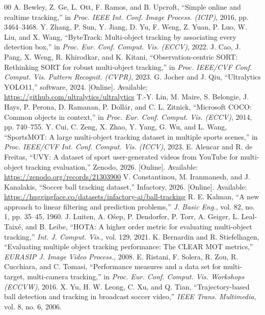 \documentclass[conference]{IEEEtran}
\begin{document}
\begin{thebibliography}{00}
 A. Bewley, Z. Ge, L. Ott, F. Ramos, and B. Upcroft, ``Simple online and realtime tracking,'' in \emph{Proc. IEEE Int. Conf. Image Process. (ICIP)}, 2016, pp. 3464--3468.
 Y. Zhang, P. Sun, Y. Jiang, D. Yu, F. Weng, Z. Yuan, P. Luo, W. Liu, and X. Wang, ``ByteTrack: Multi-object tracking by associating every detection box,'' in \emph{Proc. Eur. Conf. Comput. Vis. (ECCV)}, 2022.
 J. Cao, J. Pang, X. Weng, R. Khirodkar, and K. Kitani, ``Observation-centric SORT: Rethinking SORT for robust multi-object tracking,'' in \emph{Proc. IEEE/CVF Conf. Comput. Vis. Pattern Recognit. (CVPR)}, 2023.
 G. Jocher and J. Qiu, ``Ultralytics YOLO11,'' software, 2024. [Online]. Available: \url{https://github.com/ultralytics/ultralytics}
 T.-Y. Lin, M. Maire, S. Belongie, J. Hays, P. Perona, D. Ramanan, P. Doll\'ar, and C. L. Zitnick, ``Microsoft COCO: Common objects in context,'' in \emph{Proc. Eur. Conf. Comput. Vis. (ECCV)}, 2014, pp. 740--755.
 Y. Cui, C. Zeng, X. Zhao, Y. Yang, G. Wu, and L. Wang, ``SportsMOT: A large multi-object tracking dataset in multiple sports scenes,'' in \emph{Proc. IEEE/CVF Int. Conf. Comput. Vis. (ICCV)}, 2023.
 E. Alencar and R. de Freitas, ``UVY: A dataset of sport user-generated videos from YouTube for multi-object tracking evaluation,'' Zenodo, 2026. [Online]. Available: \url{https://zenodo.org/records/21303900}
 V. Constantinou, M. Iranmanesh, and J. Kanalakis, ``Soccer ball tracking dataset,'' Infactory, 2026. [Online]. Available: \url{https://huggingface.co/datasets/infactory-ai/ball-tracking}
 R. E. Kalman, ``A new approach to linear filtering and prediction problems,'' \emph{J. Basic Eng.}, vol. 82, no. 1, pp. 35--45, 1960.
 J. Luiten, A. O\v{s}ep, P. Dendorfer, P. Torr, A. Geiger, L. Leal-Taix\'e, and B. Leibe, ``HOTA: A higher order metric for evaluating multi-object tracking,'' \emph{Int. J. Comput. Vis.}, vol. 129, 2021.
 K. Bernardin and R. Stiefelhagen, ``Evaluating multiple object tracking performance: The CLEAR MOT metrics,'' \emph{EURASIP J. Image Video Process.}, 2008.
 E. Ristani, F. Solera, R. Zou, R. Cucchiara, and C. Tomasi, ``Performance measures and a data set for multi-target, multi-camera tracking,'' in \emph{Proc. Eur. Conf. Comput. Vis. Workshops (ECCVW)}, 2016.
 X. Yu, H. W. Leong, C. Xu, and Q. Tian, ``Trajectory-based ball detection and tracking in broadcast soccer video,'' \emph{IEEE Trans. Multimedia}, vol. 8, no. 6, 2006.

\end{thebibliography}
\end{document}
